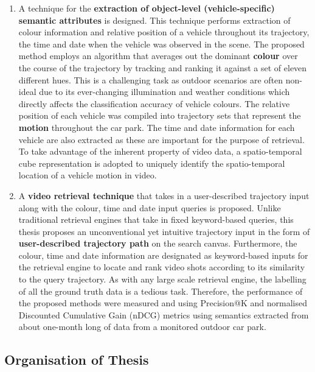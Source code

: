 \begin{enumerate}
\item A technique for the \textbf{extraction of object-level (vehicle-specific) semantic attributes} is designed. This technique performs extraction of colour information and relative position of a vehicle throughout its trajectory, the time and date when the vehicle was observed in the scene.
The proposed method employs an algorithm that averages out the dominant \textbf{colour} over the course of the trajectory by tracking and ranking it against a set of eleven different hues. This is a challenging task as outdoor scenarios are often non-ideal due to its ever-changing illumination and weather conditions which directly affects the classification accuracy of vehicle colours. The relative position of each vehicle was compiled into trajectory sets that represent the \textbf{motion} throughout the car park. The time and date information for each vehicle are also extracted as these %
are important for the purpose of retrieval. To take advantage of the inherent property of video data, a spatio-temporal cube representation is adopted to uniquely identify the spatio-temporal location of a vehicle motion in video.
\item A \textbf{video retrieval technique} that takes in a user-described trajectory input along with the colour, time and date input queries is proposed. Unlike traditional retrieval engines that take in %
fixed
keyword-based queries, this thesis proposes an unconventional yet intuitive trajectory input in the form of \textbf{user-described trajectory path} on the search canvas. Furthermore, the colour, time and date information are designated as keyword-based inputs for the retrieval engine to locate and rank video shots according to its similarity to the query trajectory. As with any large scale retrieval engine, the labelling of all the ground truth data is a tedious task. %
Therefore, the performance of the proposed methods were measured and using Precision@K and normalised Discounted Cumulative Gain (nDCG) metrics using semantics extracted from about one-month long of data from a monitored outdoor car park.
\end{enumerate}

\vspace{1em}
\subsection{Organisation of Thesis}

